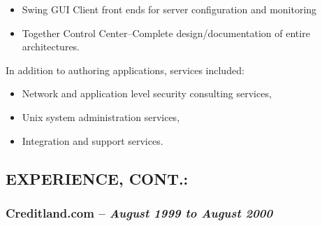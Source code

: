 \documentclass[10pt]{report}
\begin{document}
\begin{description}
\begin{list}{-}{}
\begin{itemize}
				\item{Swing GUI Client front ends for server configuration and monitoring}

				\item{Together Control Center--}Complete design/documentation of entire architectures.

			\end{itemize}

			In addition to authoring applications, services included:

			\begin{itemize}

				\item Network and application level security consulting services,

				\item Unix system administration services,

				\item Integration and support services.

			\end{itemize}

		\end{list}

	\end{description}



\subsection*{EXPERIENCE, CONT.:}

  \subsubsection*{Creditland.com -- \emph{August 1999 to August 2000}}
\end{document}

